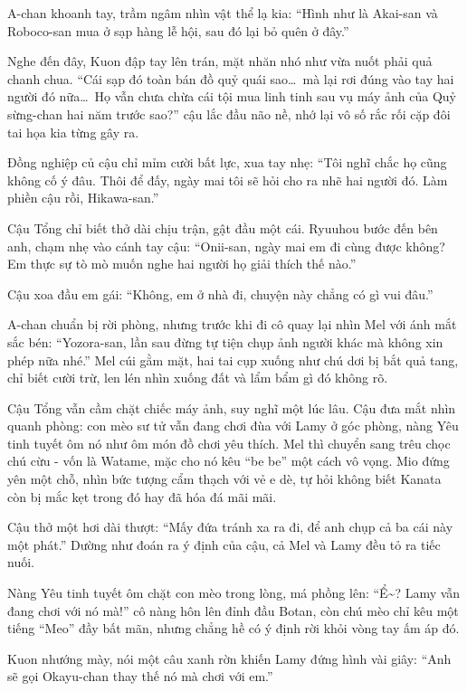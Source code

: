 \documentclass[../main.tex]{subfiles}
\begin{document}
A-chan khoanh tay, trầm ngâm nhìn vật thể lạ kia: ``Hình như là Akai-san và Roboco-san mua ở sạp hàng lễ hội, sau đó lại bỏ quên ở đây.''

Nghe đến đây, Kuon đập tay lên trán, mặt nhăn nhó như vừa nuốt phải quả chanh chua. ``Cái sạp đó toàn bán đồ quỷ quái sao\dots\ mà lại rơi đúng vào tay hai người đó nữa\dots\ Họ vẫn chưa chừa cái tội mua linh tinh sau vụ máy ảnh của Quỷ sừng-chan hai năm trước sao?'' cậu lắc đầu não nề, nhớ lại vô số rắc rối cặp đôi tai họa kia từng gây ra.

Đồng nghiệp củ cậu chỉ mỉm cười bất lực, xua tay nhẹ: ``Tôi nghĩ chắc họ cũng không cố ý đâu. Thôi để đấy, ngày mai tôi sẽ hỏi cho ra nhẽ hai người đó. Làm phiền cậu rồi, Hikawa-san.''

Cậu Tổng chỉ biết thở dài chịu trận, gật đầu một cái. Ryuuhou bước đến bên anh, chạm nhẹ vào cánh tay cậu: ``Onii-san, ngày mai em đi cùng được không? Em thực sự tò mò muốn nghe hai người họ giải thích thế nào.''

Cậu xoa đầu em gái: ``Không, em ở nhà đi, chuyện này chẳng có gì vui đâu.''

A-chan chuẩn bị rời phòng, nhưng trước khi đi cô quay lại nhìn Mel với ánh mắt sắc bén: ``Yozora-san, lần sau đừng tự tiện chụp ảnh người khác mà không xin phép nữa nhé.'' Mel cúi gằm mặt, hai tai cụp xuống như chú dơi bị bắt quả tang, chỉ biết cười trừ, len lén nhìn xuống đất và lẩm bẩm gì đó không rõ.

Cậu Tổng vẫn cầm chặt chiếc máy ảnh, suy nghĩ một lúc lâu. Cậu đưa mắt nhìn quanh phòng: con mèo sư tử vẫn đang chơi đùa với Lamy ở góc phòng, nàng Yêu tinh tuyết ôm nó như ôm món đồ chơi yêu thích. Mel thì chuyển sang trêu chọc chú cừu - vốn là Watame, mặc cho nó kêu ``be be'' một cách vô vọng. Mio đứng yên một chỗ, nhìn bức tượng cẩm thạch với vẻ e dè, tự hỏi không biết Kanata còn bị mắc kẹt trong đó hay đã hóa đá mãi mãi.


Cậu thở một hơi dài thượt: ``Mấy đứa tránh xa ra đi, để anh chụp cả ba cái này một phát.'' Dường như đoán ra ý định của cậu, cả Mel và Lamy đều tỏ ra tiếc nuối.

Nàng Yêu tinh tuyết ôm chặt con mèo trong lòng, má phồng lên: ``Ể\~{}? Lamy vẫn đang chơi với nó mà!'' cô nàng hôn lên đỉnh đầu Botan, còn chú mèo chỉ kêu một tiếng ``Meo'' đầy bất mãn, nhưng chẳng hề có ý định rời khỏi vòng tay ấm áp đó.

Kuon nhướng mày, nói một câu xanh rờn khiến Lamy đứng hình vài giây: ``Anh sẽ gọi Okayu-chan thay thế nó mà chơi với em.''
\end{document}
